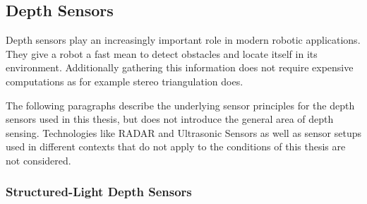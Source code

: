 \subsection{Depth Sensors}

Depth sensors play an increasingly important role in modern robotic applications.
They give a robot a fast mean to detect obstacles and locate itself in its environment.
Additionally gathering this information does not require expensive computations as for example stereo triangulation does.

The following paragraphs describe the underlying sensor principles for the depth sensors used in this thesis, but does not introduce the general area of depth sensing.
Technologies like RADAR and Ultrasonic Sensors as well as sensor setups used in different contexts that do not apply to the conditions of this thesis are not considered.

\subsubsection{Structured-Light Depth Sensors}

